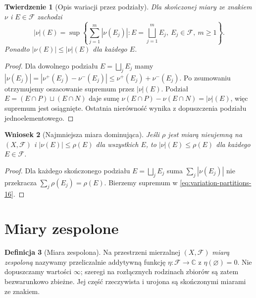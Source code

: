 \documentclass[11pt,a4paper,oneside]{book}
\numberwithin{equation}{chapter}
\theoremstyle{plain}
\newtheorem{twierdzenie}{Twierdzenie}[chapter]
\newtheorem{wniosek}[twierdzenie]{Wniosek}
\theoremstyle{definition}
\newtheorem{definicja}[twierdzenie]{Definicja}
\theoremstyle{remark}
\begin{document}
\begin{twierdzenie}[Opis wariacji przez podziały]
\label{thm:partition-variation-16}
Dla skończonej miary ze znakiem $\nu$ i $E\in\mathcal F$
zachodzi
\begin{equation}\label{eq:variation-partitions-16}
|\nu|(E)=\sup\left\{\sum_{j=1}^m|\nu(E_j)|:
E=\bigsqcup_{j=1}^mE_j,\ E_j\in\mathcal F,\ m\ge1\right\}.
\end{equation}
Ponadto $|\nu(E)|\le|\nu|(E)$ dla każdego $E$.
\end{twierdzenie}
\begin{proof}
Dla dowolnego podziału $E=\bigsqcup_jE_j$ mamy
$|\nu(E_j)|=|\nu^+(E_j)-\nu^-(E_j)|
\le\nu^+(E_j)+\nu^-(E_j)$.
Po zsumowaniu otrzymujemy oszacowanie supremum
przez $|\nu|(E)$. Podział $E=(E\cap P)\sqcup(E\cap N)$
daje sumę $\nu(E\cap P)-\nu(E\cap N)=|\nu|(E)$,
więc supremum jest osiągnięte. Ostatnia nierówność
wynika z dopuszczenia podziału jednoelementowego.
\end{proof}

\begin{wniosek}[Najmniejsza miara dominująca]
\label{cor:minimal-variation-16}
Jeśli $\rho$ jest miarą nieujemną na $(X,\mathcal F)$
i $|\nu(E)|\le\rho(E)$ dla wszystkich $E$, to
$|\nu|(E)\le\rho(E)$ dla każdego $E\in\mathcal F$.
\end{wniosek}
\begin{proof}
Dla każdego skończonego podziału
$E=\bigsqcup_jE_j$ suma $\sum_j|\nu(E_j)|$
nie przekracza $\sum_j\rho(E_j)=\rho(E)$.
Bierzemy supremum w \eqref{eq:variation-partitions-16}.
\end{proof}

\section{Miary zespolone}
\begin{definicja}[Miara zespolona]
\label{def:complex-measure-16}
Na przestrzeni mierzalnej $(X,\mathcal F)$
\emph{miarą zespoloną} nazywamy przeliczalnie addytywną
funkcję $\eta:\mathcal F\to\mathbb C$ z $\eta(\varnothing)=0$.
Nie dopuszczamy wartości $\infty$; szeregi na rozłącznych
rodzinach zbiorów są zatem bezwarunkowo zbieżne.
Jej część rzeczywista i urojona są skończonymi
miarami ze znakiem.
\end{definicja}
\end{document}
